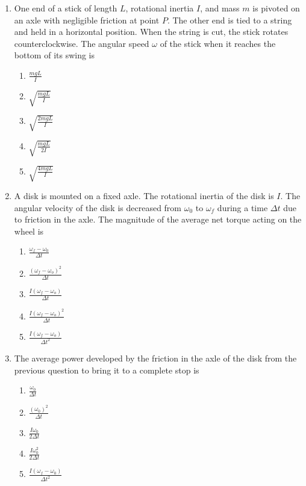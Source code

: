 \documentclass{../../../oss-apphys}
\begin{document}
\begin{multicols}{2}
\begin{enumerate}[leftmargin=18pt]
  \item One end of a stick of length $L$, rotational inertia $I$, and mass $m$
    is pivoted on an axle with negligible friction at point $P$. The other end
    is tied to a string and held in a horizontal position. When the string is
    cut, the stick rotates counterclockwise. The angular speed $\omega$ of the
    stick when it reaches the bottom of its swing is
    \begin{enumerate}[nosep,leftmargin=18pt,label=(\Alph*)]
    \item$\displaystyle\frac{mgL}{I}$
    \item$\displaystyle\sqrt{\frac{mgL}{I}}$
    \item$\displaystyle\sqrt{\frac{2mgL}{I}}$
    \item$\displaystyle\sqrt{\frac{mgL}{2I}}$
    \item$\displaystyle\sqrt{\frac{4mgL}{I}}$
    \end{enumerate}
    
  \item A disk is mounted on a fixed axle. The rotational inertia of the disk is
    $I$. The angular velocity of the disk is decreased from $\omega_0$ to
    $\omega_f$ during a time $\Delta t$ due to friction in the axle. The
    magnitude of the average net torque acting on the wheel is
    \begin{enumerate}[noitemsep,topsep=0pt,leftmargin=18pt,label=(\Alph*)]
    \item $\displaystyle\frac{\omega_f-\omega_0}{\Delta t}$
    \item $\displaystyle\frac{(\omega_f-\omega_o)^2}{\Delta t}$
    \item $\displaystyle\frac{I(\omega_f-\omega_o)}{\Delta t}$
    \item $\displaystyle\frac{I(\omega_f-\omega_o)^2}{\Delta t}$
    \item $\displaystyle\frac{I(\omega_f-\omega_o)}{\Delta t^2}$
    \end{enumerate}
    \columnbreak
    
  \item The average power developed by the friction in the axle of the disk
    from the previous question to bring it to a complete stop is
    \begin{enumerate}[nosep,leftmargin=18pt,label=(\Alph*)]
    \item $\displaystyle\frac{\omega_0}{\Delta t}$
    \item $\displaystyle\frac{(\omega_0)^2}{\Delta t}$
    \item $\displaystyle\frac{I\omega_0}{2\Delta t}$
    \item $\displaystyle\frac{I\omega_0^2}{2\Delta t}$
    \item $\displaystyle\frac{I(\omega_f-\omega_0)}{\Delta t^2}$
    \end{enumerate}
    

\end{enumerate}
\end{multicols}
\end{document}
